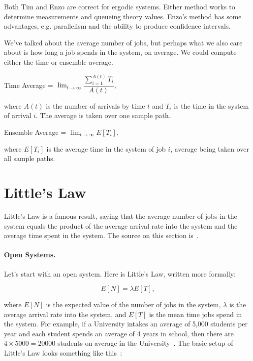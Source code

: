 \documentclass[a4paper]{report}
\begin{document}
Both Tim and Enzo are correct for ergodic systems. Either method works to determine measurements and queueing theory values. Enzo's method has some advantages, e.g. parallelism and the ability to produce confidence intervals.

We've talked about the average number of jobs, but perhaps what we also care about is how long a job spends in the system, on average. We could compute either the time or ensemble average. 

\begin{center}
	Time Average = $\lim_{t\to\infty}\dfrac{\sum_{i=1}^{A(t)} T_{i}}{A(t)},$
\end{center}

where $A(t)$ is the number of arrivals by time $t$ and $T_{i}$ is the time in the system of arrival $i$. The average is taken over one sample path.

\begin{center}
	Ensemble Average = $\lim_{t\to\infty}E[T_{i}],$
\end{center}

where $E[T_{i}]$ is the average time in the system of job $i$, average being taken over all sample paths.

\section*{Little's Law}
Little's Law is a famous result, saying that the average number of jobs in the system equals the product of the average arrival rate into the system and the average time spent in the system. The source on this section is~\cite{pmd}.

\paragraph{Open Systems.} Let's start with an open system. Here is Little's Law, written more formally:

\[
	E[N] = \lambda E[T],
\]

where $E[N]$ is the expected value of the number of jobs in the system, $\lambda$ is the average arrival rate into the system, and $E[T]$ is the mean time jobs spend in the system. For example, if a University intakes an average of 5,000 students per year and each student spends an average of 4 years in school, then there are $4 \times 5000=20000$ students on average in the University~\cite{sigman-little-law}. The basic setup of Little's Law looks something like this~\cite{pmd}:
\end{document}
